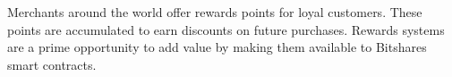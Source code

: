 Merchants around the world offer rewards points for loyal customers. These
points are accumulated to earn discounts on future purchases. Rewards systems
are a prime opportunity to add value by making them available to Bitshares
smart contracts.
